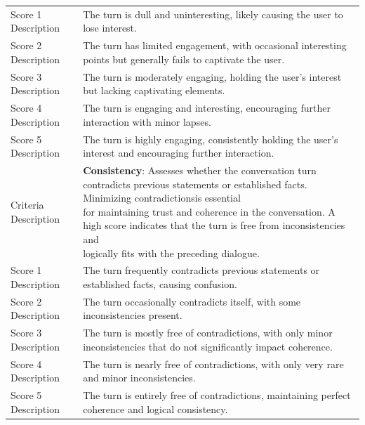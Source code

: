 \documentclass[11pt]{article}
\begin{document}
\begin{table}
{\begin{tabular}{ll}
Score 1 Description  & The turn is dull and uninteresting, likely causing the user to lose interest.                                                                                                                                     \\
Score 2 Description  & The turn has limited engagement, with occasional interesting points but generally fails to captivate the user.                                                                                        \\
Score 3 Description  & The turn is moderately engaging, holding the user's interest but lacking captivating elements.                                                                                 \\
Score 4 Description  & The turn is engaging and interesting, encouraging further interaction with minor lapses.                                                                                                                    \\
Score 5 Description  & The turn is highly engaging, consistently holding the user's interest and encouraging further interaction.                                                                             \\ 
\midrule
Criteria Description & \textbf{Consistency}: \makecell[l]{Assesses whether the conversation turn contradicts previous statements or established facts. Minimizing contradictionsis essential \\ for maintaining trust and coherence in the conversation.  A high score indicates that the turn is free from inconsistencies and \\ logically fits with the preceding dialogue.}                                                                 \\
Score 1 Description  & The turn frequently contradicts previous statements or established facts, causing confusion.                                                                                               \\
Score 2 Description  & The turn occasionally contradicts itself, with some inconsistencies present.                                                               \\
Score 3 Description  & The turn is mostly free of contradictions, with only minor inconsistencies that do not significantly impact coherence.                                                                                                                                    \\
Score 4 Description  & The turn is nearly free of contradictions, with only very rare and minor inconsistencies.                                                                \\
Score 5 Description  & The turn is entirely free of contradictions, maintaining perfect coherence and logical consistency.  \\ 
\bottomrule
\end{tabular}

}
\end{table}
\end{document}
